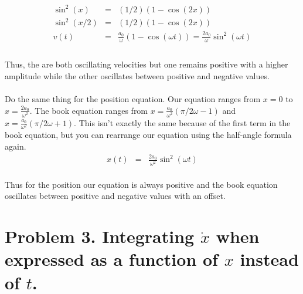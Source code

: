 \documentclass[11pt]{amsart}
\begin{document}
\begin{eqnarray*}
\sin^{2}(x) &=& (1/2)(1 - \cos(2x)) 
\\
\sin^{2}(x/2) &=& (1/2)(1 - \cos(2x)) 
\\ 
v(t) &=& \frac{a_{0}}{\omega}(1 - \cos(\omega{}t)) = \frac{2a_{0}}{\omega} \sin^{2}(\omega{}t) 
\\ 
\end{eqnarray*} \\
Thus, the are both oscillating velocities but one remains positive with a higher amplitude while the other oscillates between  positive and negative values. \\ \\
Do the same thing for the position equation. Our equation ranges from $x=0$ to $x=\frac{2a_{0}}{\omega^{2}}$. The book equation ranges from $x=\frac{a_{0}}{\omega^{2}}(\pi/2\omega-1)$ and $x=\frac{a_{0}}{\omega^{2}}(\pi/2\omega+1)$. This isn't exactly the same because of the first term in the book equation, but you can rearrange our equation using the half-angle formula again.\\ 
\begin{eqnarray*} 
x(t) &=& \frac{2a_{0}}{\omega^{2}} \sin^{2}(\omega{}t) 
\end{eqnarray*} \\
Thus for the position our equation is always positive and the book equation oscillates between positive and negative values with an offset. \\ 

\section{Problem 3. Integrating $\dot{x}$ when expressed as a function of $x$ instead of $t$.} 
\end{document}
